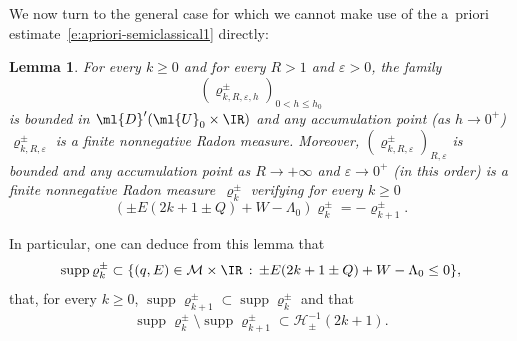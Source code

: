 \documentclass[10pt]{amsart}
\theoremstyle{plain}
\newtheorem{lemm}[theo]{Lemma}
\theoremstyle{definition}
\theoremstyle{remark}
\begin{document}
We now turn to the general case for which we cannot make use of the a~priori estimate~\eqref{e:apriori-semiclassical1} directly:

\begin{lemm}
\label{l:k_step_support} For every $ k \geq 0$ and for every $R>1$ and $\varepsilon>0$, the family
\[
(\varrho_{k,R,\varepsilon,h}^\pm)_{0<h\leq h_0}
\]
is bounded in $\ml{D}'(\ml{U}_0\times\IR)$ and any accumulation point (as $h\to 0^+$) $\varrho_{k,R,\varepsilon}^\pm$ is a finite nonnegative Radon measure. Moreover, $(\varrho_{k,R,\varepsilon}^\pm)_{R,\varepsilon}$ is bounded and any accumulation point as $R\to+\infty$ and $\varepsilon\to 0^+$ (in this order) is a finite nonnegative Radon measure~$\varrho_{k}^\pm$ verifying for every $k\geq 0$
\[
(\pm E(2k+1 \pm Q)+W-\Lambda_0)\varrho_{k}^{\pm}= - \varrho^\pm_{k+1}.
\]
\end{lemm}

In particular, one can deduce from this lemma that
\[
\operatorname{supp} \varrho_{k}^\pm \subset \{ (q,E) \in \mathcal{M} \times \IR \, : \, \pm E (2k +1 \pm Q) + W - \Lambda_0 \leq 0 \},
\]
that, for every $k\geq 0$, $\operatorname{supp} \varrho_{k+1}^{\pm}\subset\operatorname{supp} \varrho_{k}^{\pm}$ and that
\[
\operatorname{supp} \varrho_{k}^{\pm}\setminus \operatorname{supp} \varrho_{k+1}^\pm \subset \mathcal{H}_\pm^{-1}(2k+1) .
\]
\end{document}
